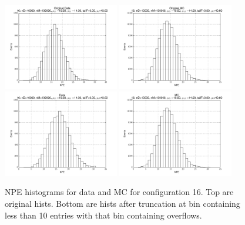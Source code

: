  \begin{figure}[htbp] \begin{center} 
\includegraphics[width=0.45\textwidth]{../FIGURES/16/FIG_Original_Data.pdf} 
\includegraphics[width=0.45\textwidth]{../FIGURES/16/FIG_Original_MC.pdf} 
\includegraphics[width=0.45\textwidth]{../FIGURES/16/FIG_Data.pdf} 
\includegraphics[width=0.45\textwidth]{../FIGURES/16/FIG_MC.pdf} 
\caption{NPE histograms for data and MC for configuration 16. Top are original hists. Bottom are hists after truncation at bin containing less than 10 entries with that bin containing overflows.} 
\label{tab:npe_16} 
\end{center} \end{figure} 

 